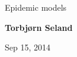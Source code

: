 \documentclass[%
twoside,                 %
final,                   %
10pt]{article}
\begin{document}




\thispagestyle{empty}

\begin{center}
{\LARGE\bf
\begin{spacing}{1.25}
Epidemic models
\end{spacing}
}
\end{center}


\begin{center}
{\bf Torbjørn Seland${}^{}$} \\ [0mm]
\end{center}

    \begin{center}
\end{center}


\begin{center}
Sep 15, 2014
\end{center}

\vspace{1cm}


\tableofcontents


\vspace{1cm} %
\end{document}
